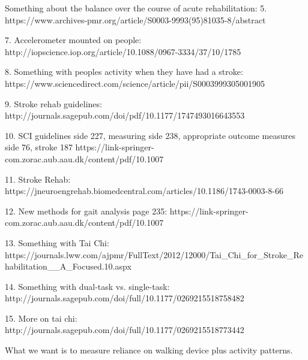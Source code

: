 Something about the balance over the course of acute rehabilitation: 5. https://www.archives-pmr.org/article/S0003-9993(95)81035-8/abstract

7. Accelerometer mounted on people: http://iopscience.iop.org/article/10.1088/0967-3334/37/10/1785

8. Something with peoples activity when they have had a stroke: https://www.sciencedirect.com/science/article/pii/S0003999305001905

9. Stroke rehab guidelines: http://journals.sagepub.com/doi/pdf/10.1177/1747493016643553

10. SCI guidelines side 227, measuring side 238, appropriate outcome measures side 76, stroke 187 https://link-springer-com.zorac.aub.aau.dk/content/pdf/10.1007%

11. Stroke Rehab:
https://jneuroengrehab.biomedcentral.com/articles/10.1186/1743-0003-8-66

12. New methods for gait analysis page 235:
https://link-springer-com.zorac.aub.aau.dk/content/pdf/10.1007%

13. Something with Tai Chi:
https://journals.lww.com/ajpmr/FullText/2012/12000/Tai_Chi_for_Stroke_Rehabilitation__A_Focused.10.aspx 

14. Something with dual-task vs. single-task:
http://journals.sagepub.com/doi/full/10.1177/0269215518758482

15. More on tai chi:
http://journals.sagepub.com/doi/full/10.1177/0269215518773442

What we want is to measure reliance on walking device plus activity patterns.